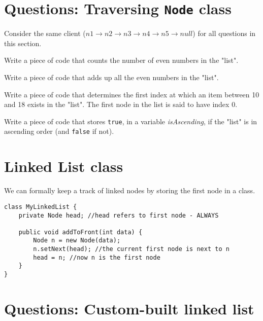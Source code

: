 \documentclass{exam}
\begin{document}
\section*{Questions: Traversing \texttt{Node} class}
Consider the same client ($n1 \rightarrow n2 \rightarrow n3 \rightarrow n4 \rightarrow n5 \rightarrow null$) for all questions in this section.

\begin{questions}
\question Write a piece of code that counts the number of even numbers in the "list".

\question Write a piece of code that adds up all the even numbers in the "list".

\question Write a piece of code that determines the first index at which an item between 10 and 18 exists in the "list". The first node in the list is said to have index 0.

\question Write a piece of code that stores \texttt{true}, in a variable \textit{isAscending}, if the "list" is in ascending order (and \texttt{false} if not).
\end{questions}

\newpage

\section*{Linked List class}

We can formally keep a track of linked nodes by storing the first node in a class.

\begin{lstlisting}
class MyLinkedList {
	private Node head; //head refers to first node - ALWAYS
	
	public void addToFront(int data) {
		Node n = new Node(data);
		n.setNext(head); //the current first node is next to n
		head = n; //now n is the first node
	}
}
\end{lstlisting}

\section*{Questions: Custom-built linked list}
\end{document}
